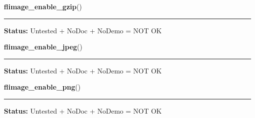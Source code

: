     \label{xformslib:library:flimage_enable_gzip}

    \vspace{0.5ex}

\hspace{.8\funcindent}\begin{boxedminipage}{\funcwidth}

    \raggedright \textbf{flimage\_enable\_gzip}()

    \vspace{-1.5ex}

    \rule{\textwidth}{0.5\fboxrule}
\setlength{\parskip}{2ex}
\setlength{\parskip}{1ex}
\textbf{Status:} Untested + NoDoc + NoDemo = NOT OK



    \end{boxedminipage}

    \label{xformslib:library:flimage_enable_jpeg}

    \vspace{0.5ex}

\hspace{.8\funcindent}\begin{boxedminipage}{\funcwidth}

    \raggedright \textbf{flimage\_enable\_jpeg}()

    \vspace{-1.5ex}

    \rule{\textwidth}{0.5\fboxrule}
\setlength{\parskip}{2ex}
\setlength{\parskip}{1ex}
\textbf{Status:} Untested + NoDoc + NoDemo = NOT OK



    \end{boxedminipage}

    \label{xformslib:library:flimage_enable_png}

    \vspace{0.5ex}

\hspace{.8\funcindent}\begin{boxedminipage}{\funcwidth}

    \raggedright \textbf{flimage\_enable\_png}()

    \vspace{-1.5ex}

    \rule{\textwidth}{0.5\fboxrule}
\setlength{\parskip}{2ex}
\setlength{\parskip}{1ex}
\textbf{Status:} Untested + NoDoc + NoDemo = NOT OK



    \end{boxedminipage}


